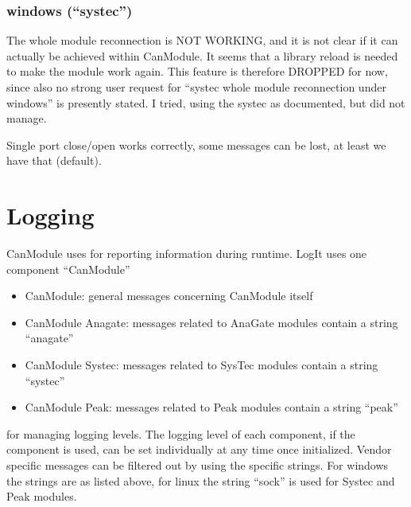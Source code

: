 \documentclass[a4paper,10pt,english]{sphinxmanual}
\begin{document}
\subsection{windows (“systec”)}
\label{\detokenize{reconnection:windows-systec}}
\sphinxAtStartPar
The whole module reconnection is NOT WORKING, and it is not clear if it can actually
be achieved within CanModule. It seems that a library reload is needed to make the module work again.
This feature is therefore DROPPED for now, since also no strong user request for “systec whole module reconnection
under windows” is presently stated. I tried, using the systec  as documented, but did not manage.

\sphinxAtStartPar
Single port close/open works correctly, some messages can be lost, at least we have that (default).


\chapter{Logging}
\label{\detokenize{logging:logging}}\label{\detokenize{logging::doc}}
\sphinxAtStartPar
CanModule uses  for reporting information during runtime. LogIt uses one component “CanModule”
\begin{itemize}
\item {} 
\sphinxAtStartPar
CanModule: general messages concerning CanModule itself

\item {} 
\sphinxAtStartPar
CanModule Anagate: messages related to AnaGate modules contain a string “anagate”

\item {} 
\sphinxAtStartPar
CanModule Systec: messages related to SysTec modules contain a string “systec”

\item {} 
\sphinxAtStartPar
CanModule Peak: messages related to Peak modules contain a string “peak”

\end{itemize}

\sphinxAtStartPar
for managing logging levels. The logging level of each component, if the component is used, can be set individually
at any time once initialized. Vendor specific messages can be filtered out by using the specific strings.
For windows the strings are as listed above, for linux the string “sock” is used for Systec and Peak modules.
\end{document}
